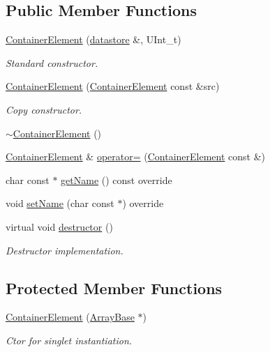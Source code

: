 \subsection*{Public Member Functions}
\begin{DoxyCompactItemize}
\item 
\hyperlink{classpanda_1_1ContainerElement_a0d63c1dfce3c8ef6f474a14518b1e35a}{Container\-Element} (\hyperlink{structpanda_1_1ContainerElement_1_1datastore}{datastore} \&, U\-Int\-\_\-t)
\begin{DoxyCompactList}\small\item\em Standard constructor. \end{DoxyCompactList}\item 
\hyperlink{classpanda_1_1ContainerElement_ae4f62cd83a20b996d51ae99dc5c84cce}{Container\-Element} (\hyperlink{classpanda_1_1ContainerElement}{Container\-Element} const \&src)
\begin{DoxyCompactList}\small\item\em Copy constructor. \end{DoxyCompactList}\item 
\hyperlink{classpanda_1_1ContainerElement_a35a78637ba94faa74dd3c79569547872}{$\sim$\-Container\-Element} ()
\item 
\hyperlink{classpanda_1_1ContainerElement}{Container\-Element} \& \hyperlink{classpanda_1_1ContainerElement_ae8ba59e4cb5d7c1d491fc87c9360f039}{operator=} (\hyperlink{classpanda_1_1ContainerElement}{Container\-Element} const \&)
\item 
char const $\ast$ \hyperlink{classpanda_1_1ContainerElement_a513d6d0e62b5f4742d9d4bbfdf7e8ac8}{get\-Name} () const override
\item 
void \hyperlink{classpanda_1_1ContainerElement_aa08cde4084e7999257de2378579e9807}{set\-Name} (char const $\ast$) override
\item 
virtual void \hyperlink{classpanda_1_1ContainerElement_aa1c71695dae992e82bf91f354aa8480c}{destructor} ()
\begin{DoxyCompactList}\small\item\em Destructor implementation. \end{DoxyCompactList}\end{DoxyCompactItemize}
\subsection*{Protected Member Functions}
\begin{DoxyCompactItemize}
\item 
\hyperlink{classpanda_1_1ContainerElement_aa1ba7438d31c3d26d7baddda5d4fb9a4}{Container\-Element} (\hyperlink{classpanda_1_1ArrayBase}{Array\-Base} $\ast$)
\begin{DoxyCompactList}\small\item\em Ctor for singlet instantiation. \end{DoxyCompactList}\end{DoxyCompactItemize}
